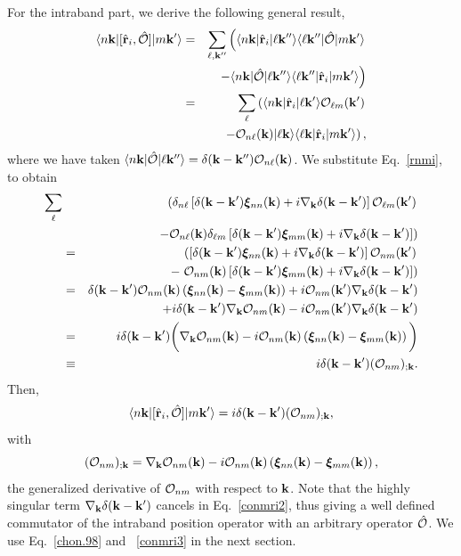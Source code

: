 \documentclass[floatfix,prb,aps,superscriptaddress,11pt,preprint]{revtex4}
\begin{document}
For the intraband part, we derive the following general result,
\begin{eqnarray}\label{conmri}
\langle n\mathbf{k} |[\hat{\mathbf{r}}_i,\hat{{\cal O}}]| m\mathbf{k}' \rangle
&=&
\sum_{\ell,\mathbf{k}''}
\left(
\langle n\mathbf{k} |
\hat{\mathbf{r}}_i
| \ell\mathbf{k}'' \rangle
\langle \ell\mathbf{k}'' |
\hat{{\cal O}}
| m\mathbf{k}' \rangle
\right.
\nonumber \\
&&
\left.
-
\langle n\mathbf{k} |
\hat{{\cal O}}
| \ell\mathbf{k}'' \rangle
\langle \ell\mathbf{k}'' |
\hat{\mathbf{r}}_i
| m\mathbf{k}' \rangle
\right)
\nonumber \\
&=&
\sum_{\ell}
\left(
\langle n\mathbf{k} |
\hat{\mathbf{r}}_i
| \ell\mathbf{k}' \rangle
{\cal O}_{\ell m}(\mathbf{k}')
\right.
\nonumber \\
&&
\left.
-
{\cal O}_{n\ell}(\mathbf{k})
| \ell\mathbf{k} \rangle
\langle \ell\mathbf{k} |
\hat{\mathbf{r}}_i
| m\mathbf{k}' \rangle
\right)
,
\end{eqnarray}
where we have taken
$\langle n\mathbf{k} |\hat{{\cal O}}| \ell\mathbf{k}'' \rangle=\delta(\mathbf{k}-\mathbf{k}''){\cal O}_{n\ell}(\mathbf{k})$.
We substitute Eq.~\eqref{rnmi}, to obtain
\begin{eqnarray}\label{conmri2}
\sum_{\ell}&&
\left(
\delta_{n\ell}\left[\delta(\mathbf{k}-\mathbf{k}')\boldsymbol{\xi}_{nn}(\mathbf{k})
+i\nabla_{\mathbf{k}}\delta(\mathbf{k}-\mathbf{k}')\right]
{\cal O}_{\ell m}(\mathbf{k}')
\right.
\nonumber \\
&&
\left.
-
{\cal O}_{n\ell}(\mathbf{k})
\delta_{\ell m}\left[\delta(\mathbf{k}-\mathbf{k}')\boldsymbol{\xi}_{mm}(\mathbf{k})
+i\nabla_{\mathbf{k}}\delta(\mathbf{k}-\mathbf{k}')\right]
\right)
\nonumber\\
&=&
\left(
\left[\delta(\mathbf{k}-\mathbf{k}')\boldsymbol{\xi}_{nn}(\mathbf{k})
+i\nabla_{\mathbf{k}}\delta(\mathbf{k}-\mathbf{k}')\right]
{\cal O}_{n m}(\mathbf{k}')
\right.
\nonumber \\
&&-
\left.
{\cal O}_{nm}(\mathbf{k})
\left[\delta(\mathbf{k}-\mathbf{k}')\boldsymbol{\xi}_{mm}(\mathbf{k})
+i\nabla_{\mathbf{k}}\delta(\mathbf{k}-\mathbf{k}')\right]
\right)
\nonumber\\
&=&
\delta(\mathbf{k}-\mathbf{k}')
{\cal O}_{nm}(\mathbf{k})
\left(
\boldsymbol{\xi}_{nn}(\mathbf{k})
-
\boldsymbol{\xi}_{mm}(\mathbf{k})
\right)
+i{\cal O}_{n m}(\mathbf{k}')
\nabla_{\mathbf{k}}
\delta(\mathbf{k}-\mathbf{k}')
\nonumber \\
&&+i
\delta(\mathbf{k}-\mathbf{k}')
\nabla_{\mathbf{k}}
{\cal O}_{n m}(\mathbf{k})
-
i{\cal O}_{n m}(\mathbf{k}')
\nabla_{\mathbf{k}}\delta(\mathbf{k}-\mathbf{k}')
\nonumber \\
&=&
i\delta(\mathbf{k}-\mathbf{k}')
\bigg(
\nabla_{\mathbf{k}}
{\cal O}_{n m}(\mathbf{k})
-
i
{\cal O}_{nm}(\mathbf{k})
\left(
\boldsymbol{\xi}_{nn}(\mathbf{k})
-
\boldsymbol{\xi}_{mm}(\mathbf{k})
\right)
\bigg)
\nonumber \\
&\equiv&
i\delta(\mathbf{k}-\mathbf{k}')({\cal O}_{nm})_{;\mathbf{k}}
.
\end{eqnarray}
Then,
\begin{equation}\label{conmri3}
\langle n\mathbf{k} |[\hat{\mathbf{r}}_i,\hat{{\cal O}}]| m\mathbf{k}' \rangle
=i\delta(\mathbf{k}-\mathbf{k}')({\cal O}_{nm})_{;\mathbf{k}}
,
\end{equation} 
with
\begin{equation}\label{gendev}
({\cal O}_{nm})_{;\mathbf{k}}=
\nabla_{\mathbf{k}}
{\cal O}_{n m}(\mathbf{k})
-
i
{\cal O}_{nm}(\mathbf{k})
\left(
\boldsymbol{\xi}_{nn}(\mathbf{k})
-
\boldsymbol{\xi}_{mm}(\mathbf{k})
\right)
,
\end{equation}
the generalized derivative of ${\cal O}_{nm}$ with respect to $\mathbf{k}$.
Note that the highly singular term $\nabla_{\mathbf{k}}\delta(\mathbf{k}-\mathbf{k}')$
cancels in Eq.~\eqref{conmri2}, thus giving a well defined commutator
of the intraband position operator with an arbitrary operator $\hat{{\cal O}}$.
We use Eq.~\eqref{chon.98} and ~\eqref{conmri3}  in the next section.
\end{document}
